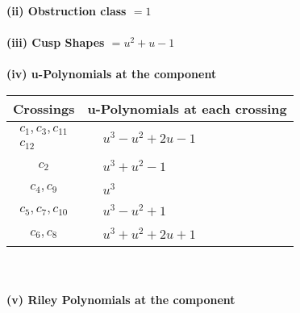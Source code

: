 \documentclass[1p]{elsarticle_modified}
\theoremstyle{definition}
\begin{document}
\flushleft \textbf{(ii) Obstruction class $= 1$}\\~\\
\flushleft \textbf{(iii) Cusp Shapes $= u^2+u-1$}\\~\\
\newpage\renewcommand{\arraystretch}{1}
\flushleft \textbf{(iv) u-Polynomials at the component}\newline \\
\begin{tabular}{m{50pt}|m{274pt}}
Crossings & \hspace{64pt}u-Polynomials at each crossing \\
\hline $$\begin{aligned}c_{1},c_{3},c_{11}\\c_{12}\end{aligned}$$&$\begin{aligned}
&u^3- u^2+2 u-1
\end{aligned}$\\
\hline $$\begin{aligned}c_{2}\end{aligned}$$&$\begin{aligned}
&u^3+u^2-1
\end{aligned}$\\
\hline $$\begin{aligned}c_{4},c_{9}\end{aligned}$$&$\begin{aligned}
&u^3
\end{aligned}$\\
\hline $$\begin{aligned}c_{5},c_{7},c_{10}\end{aligned}$$&$\begin{aligned}
&u^3- u^2+1
\end{aligned}$\\
\hline $$\begin{aligned}c_{6},c_{8}\end{aligned}$$&$\begin{aligned}
&u^3+u^2+2 u+1
\end{aligned}$\\
\hline
\end{tabular}\\~\\
\newpage\renewcommand{\arraystretch}{1}
\flushleft \textbf{(v) Riley Polynomials at the component}\newline \\
\end{document}
